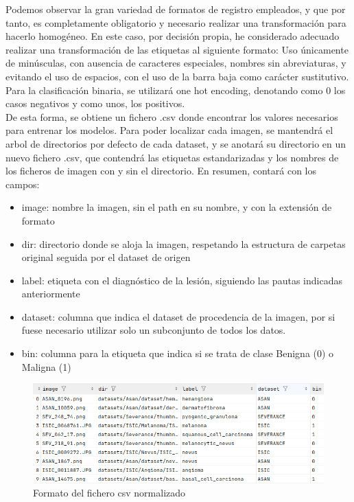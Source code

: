 Podemos observar la gran variedad de formatos de registro empleados, y que por tanto, es completamente obligatorio y necesario realizar una transformación para hacerlo homogéneo. En este caso, por decisión propia, he considerado adecuado realizar una transformación de las etiquetas al siguiente formato: Uso únicamente de minúsculas, con ausencia de caracteres especiales, nombres sin abreviaturas, y evitando el uso de espacios, con el uso de la barra baja como carácter sustitutivo. Para la clasificación binaria, se utilizará one hot encoding, denotando como 0 los casos negativos y como unos, los positivos.\\


De esta forma, se obtiene un fichero .csv donde encontrar los valores necesarios para entrenar los modelos. Para poder localizar cada imagen, se mantendrá el arbol de directorios por defecto de cada dataset, y se anotará su directorio en un nuevo fichero .csv, que contendrá las etiquetas estandarizadas y los nombres de los ficheros de imagen con y sin el directorio. En resumen, contará con los campos:

\begin{itemize}
	\item image: nombre la imagen, sin el path en su nombre, y con la extensión de formato
	\item dir: directorio donde se aloja la imagen, respetando la estructura de carpetas original seguida por el dataset de origen
	\item label: etiqueta con el diagnóstico de la lesión, siguiendo las pautas indicadas anteriormente
	\item dataset: columna que indica el dataset de procedencia de la imagen, por si fuese necesario utilizar solo un subconjunto de todos los datos.
	\item bin: columna para la etiqueta que indica si se trata de clase Benigna (0) o Maligna (1)
\end{itemize}

\begin{figure}[H]
	\centering
	\label {formatocsv}
	\includegraphics[scale = 0.55]{imagenes/formatocsv.png}
	\caption{Formato del fichero csv normalizado}
\end{figure}

